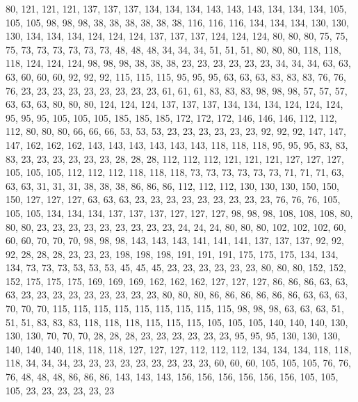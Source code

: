 80, 121, 121, 121, 137, 137, 137, 134, 134, 134, 143, 143, 143, 134, 134, 134, 105, 105, 105, 98, 98, 98, 38, 38, 38, 38, 38, 38, 116, 116, 116, 134, 134, 134, 130, 130, 130, 134, 134, 134, 124, 124, 124, 137, 137, 137, 124, 124, 124, 80, 80, 80, 75, 75, 75, 73, 73, 73, 73, 73, 73, 48, 48, 48, 34, 34, 34, 51, 51, 51, 80, 80, 80, 118, 118, 118, 124, 124, 124, 98, 98, 98, 38, 38, 38, 23, 23, 23, 23, 23, 23, 34, 34, 34, 63, 63, 63, 60, 60, 60, 92, 92, 92, 115, 115, 115, 95, 95, 95, 63, 63, 63, 83, 83, 83, 76, 76, 76, 23, 23, 23, 23, 23, 23, 23, 23, 23, 61, 61, 61, 83, 83, 83, 98, 98, 98, 57, 57, 57, 63, 63, 63, 80, 80, 80, 124, 124, 124, 137, 137, 137, 134, 134, 134, 124, 124, 124, 95, 95, 95, 105, 105, 105, 185, 185, 185, 172, 172, 172, 146, 146, 146, 112, 112, 112, 80, 80, 80, 66, 66, 66, 53, 53, 53, 23, 23, 23, 23, 23, 23, 92, 92, 92, 147, 147, 147, 162, 162, 162, 143, 143, 143, 143, 143, 143, 118, 118, 118, 95, 95, 95, 83, 83, 83, 23, 23, 23, 23, 23, 23, 28, 28, 28, 112, 112, 112, 121, 121, 121, 127, 127, 127, 105, 105, 105, 112, 112, 112, 118, 118, 118, 73, 73, 73, 73, 73, 73, 71, 71, 71, 63, 63, 63, 31, 31, 31, 38, 38, 38, 86, 86, 86, 112, 112, 112, 130, 130, 130, 150, 150, 150, 127, 127, 127, 63, 63, 63, 23, 23, 23, 23, 23, 23, 23, 23, 23, 76, 76, 76, 105, 105, 105, 134, 134, 134, 137, 137, 137, 127, 127, 127, 98, 98, 98, 108, 108, 108, 80, 80, 80, 23, 23, 23, 23, 23, 23, 23, 23, 23, 24, 24, 24, 80, 80, 80, 102, 102, 102, 60, 60, 60, 70, 70, 70, 98, 98, 98, 143, 143, 143, 141, 141, 141, 137, 137, 137, 92, 92, 92, 28, 28, 28, 23, 23, 23, 198, 198, 198, 191, 191, 191, 175, 175, 175, 134, 134, 134, 73, 73, 73, 53, 53, 53, 45, 45, 45, 23, 23, 23, 23, 23, 23, 80, 80, 80, 152, 152, 152, 175, 175, 175, 169, 169, 169, 162, 162, 162, 127, 127, 127, 86, 86, 86, 63, 63, 63, 23, 23, 23, 23, 23, 23, 23, 23, 23, 80, 80, 80, 86, 86, 86, 86, 86, 86, 63, 63, 63, 70, 70, 70, 115, 115, 115, 115, 115, 115, 115, 115, 115, 98, 98, 98, 63, 63, 63, 51, 51, 51, 83, 83, 83, 118, 118, 118, 115, 115, 115, 105, 105, 105, 140, 140, 140, 130, 130, 130, 70, 70, 70, 28, 28, 28, 23, 23, 23, 23, 23, 23, 95, 95, 95, 130, 130, 130, 140, 140, 140, 118, 118, 118, 127, 127, 127, 112, 112, 112, 134, 134, 134, 118, 118, 118, 34, 34, 34, 23, 23, 23, 23, 23, 23, 23, 23, 23, 60, 60, 60, 105, 105, 105, 76, 76, 76, 48, 48, 48, 86, 86, 86, 143, 143, 143, 156, 156, 156, 156, 156, 156, 105, 105, 105, 23, 23, 23, 23, 23, 23